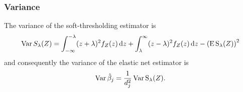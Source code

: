 \documentclass[aspectratio=1610,onlytextwidth]{beamer}
\begin{document}
\begin{frame}[c]
  \frametitle{Variance}

  The variance of the soft-thresholding estimator is
  \begin{equation*}
    \operatorname{Var} {S_\lambda(Z)} = \int_{-\infty}^{-\lambda}(z + \lambda)^2f_Z(z) \mathop{}\!\mathrm{d} z + \int_{\lambda}^\infty (z - \lambda)^2 f_Z(z) \mathop{}\!\mathrm{d} z - \left(\operatorname{E} \operatorname{S}_\lambda(Z)\right)^2
  \end{equation*}
  and consequently the variance of the elastic net estimator is
  \begin{equation*}
    \operatorname{Var} \hat\beta_j = \frac{1}{d_j^2} \operatorname{Var} \operatorname{S}_\lambda(Z).
  \end{equation*}

\end{frame}

%
%
%
%
%
\end{document}
